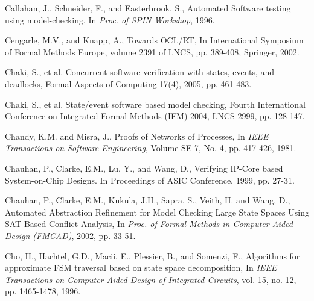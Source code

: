 {\begin{thebibliography}{99}
 Callahan, J., Schneider, F., and Easterbrook, S.,
	Automated Software testing using model-checking, In {\em Proc. of 
	SPIN Workshop}, 1996. 

 Cengarle, M.V., and Knapp, A., Towards OCL/RT,
    In International Symposium of Formal Methods Europe,
    volume 2391 of LNCS, pp. 389-408, Springer, 2002. 

 Chaki, S., et al.
    Concurrent software verification with states, events, and deadlocks,
    Formal Aspects of Computing 17(4), 2005, pp. 461-483.

 Chaki, S., et al.
    State/event software based model checking,
    Fourth International Conference on Integrated Formal Methods
    (IFM) 2004, LNCS 2999, pp. 128-147. 

 Chandy, K.M. and Misra, J., Proofs of Networks of Processes,
	In {\em IEEE Transactions on Software Engineering}, Volume SE-7,
	No. 4, pp. 417-426, 1981.

 Chauhan, P., Clarke, E.M., Lu, Y., and
        Wang, D., Verifying IP-Core based
        System-on-Chip Designs. In Proceedings of ASIC Conference, 1999,
        pp. 27-31.

 Chauhan, P., Clarke, E.M., Kukula, J.H.,
    Sapra, S., Veith, H. and Wang, D., Automated Abstraction Refinement
    for Model Checking Large State Spaces Using SAT Based Conflict
    Analysis, In {\em Proc. of Formal Methods in Computer Aided Design 
    (FMCAD)}, 2002, pp. 33-51.

 Cho, H., Hachtel, G.D., Macii, E., Plessier, B.,
        and Somenzi, F., Algorithms for approximate FSM traversal
        based on state space decomposition, In {\em IEEE Transactions
        on Computer-Aided Design of Integrated Circuits}, vol. 15,
        no. 12, pp. 1465-1478, 1996. 





\end{thebibliography}}
